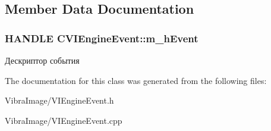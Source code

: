 \subsection{Member Data Documentation}
\hypertarget{class_c_v_i_engine_event_a46978ca1891c378503c533b3a5b714ef}{
\subsubsection[{m\+\_\+h\+Event}]{\setlength{\rightskip}{0pt plus 5cm}H\+A\+N\+D\+L\+E C\+V\+I\+Engine\+Event\+::m\+\_\+h\+Event}}\label{class_c_v_i_engine_event_a46978ca1891c378503c533b3a5b714ef}


Дескриптор события 



The documentation for this class was generated from the following files\+:\begin{DoxyCompactItemize}
\item 
Vibra\+Image/V\+I\+Engine\+Event.\+h\item 
Vibra\+Image/V\+I\+Engine\+Event.\+cpp\end{DoxyCompactItemize}
